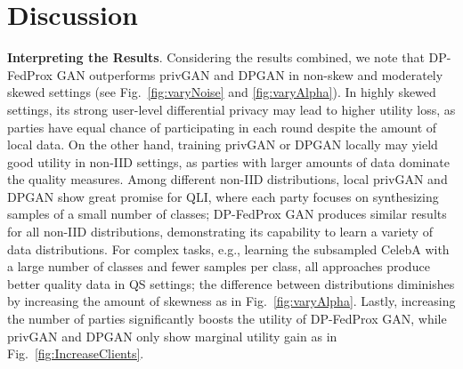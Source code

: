 \documentclass[conference]{IEEEtran}
\newcommand{\partitle}[1]{\smallskip \noindent \textbf{#1}.}
\begin{document}
\section{Discussion}


\partitle{Interpreting the Results} %
Considering the results combined, we note that DP-FedProx GAN outperforms privGAN and DPGAN in non-skew and moderately skewed settings (see Fig.~\ref{fig:varyNoise} and \ref{fig:varyAlpha}). In highly skewed settings, its strong user-level differential privacy may lead to higher utility loss, as parties have equal chance of participating in each round despite the amount of local data. %
On the other hand, training privGAN or DPGAN locally may yield good utility in non-IID settings, as parties with larger amounts of data dominate the quality measures. Among different non-IID distributions, local privGAN and DPGAN show great promise for QLI, where each party focuses on synthesizing samples of a small number of classes; DP-FedProx GAN produces similar results for all non-IID distributions, demonstrating its capability to learn a variety of data distributions. For complex tasks, e.g., learning the subsampled CelebA with a large number of classes and fewer samples per class, all approaches produce better quality data in QS settings; the difference between  distributions diminishes by increasing the amount of skewness as in Fig.~\ref{fig:varyAlpha}. {Lastly, increasing the number of parties significantly boosts the utility of DP-FedProx GAN, while privGAN and DPGAN only show marginal utility gain as in Fig.~\ref{fig:IncreaseClients}.}



\end{document}

